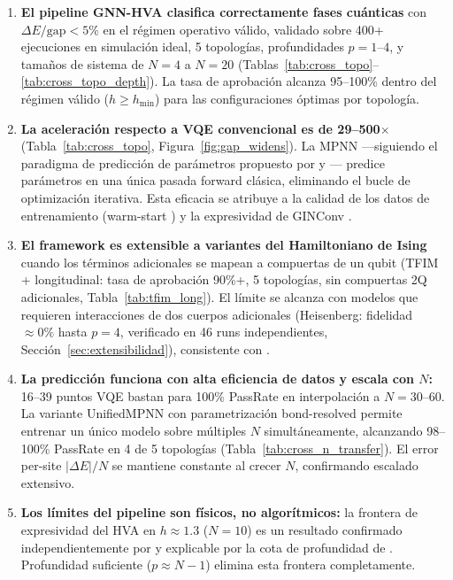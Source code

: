 \documentclass[11pt,a4paper,spanish]{book}
\begin{document}
\begin{enumerate}
    \item \textbf{El pipeline GNN-HVA clasifica correctamente fases cuánticas} con $\Delta E/\text{gap} < 5\%$ en el régimen operativo válido, validado sobre 400+ ejecuciones en simulación ideal, 5 topologías, profundidades $p = 1$--$4$, y tamaños de sistema de $N = 4$ a $N = 20$ (Tablas~\ref{tab:cross_topo}--\ref{tab:cross_topo_depth}). La tasa de aprobación alcanza 95--100\% dentro del régimen válido ($h \geq h_{\min}$) para las configuraciones óptimas por topología.

    \item \textbf{La aceleración respecto a VQE convencional es de 29--500$\times$} (Tabla~\ref{tab:cross_topo}, Figura~\ref{fig:gap_widens}). La MPNN ---siguiendo el paradigma de predicción de parámetros propuesto por \citet{miao2024} y \citet{zhang2025}--- predice parámetros en una única pasada forward clásica, eliminando el bucle de optimización iterativa. Esta eficacia se atribuye a la calidad de los datos de entrenamiento (warm-start \citep{puig2025}) y la expresividad de GINConv \citep{xu2019}.

    \item \textbf{El framework es extensible a variantes del Hamiltoniano de Ising} cuando los términos adicionales se mapean a compuertas de un qubit (TFIM + longitudinal: tasa de aprobación 90\%+, 5 topologías, sin compuertas 2Q adicionales, Tabla~\ref{tab:tfim_long}). El límite se alcanza con modelos que requieren interacciones de dos cuerpos adicionales (Heisenberg: fidelidad $\approx 0\%$ hasta $p = 4$, verificado en 46 runs independientes, Sección~\ref{sec:extensibilidad}), consistente con \citet{wiersema2020}.

    \item \textbf{La predicción funciona con alta eficiencia de datos y escala con $N$:} 16--39 puntos VQE bastan para 100\% PassRate en interpolación a $N = 30$--$60$. La variante UnifiedMPNN con parametrización bond-resolved permite entrenar un único modelo sobre múltiples $N$ simultáneamente, alcanzando 98--100\% PassRate en 4 de 5 topologías (Tabla~\ref{tab:cross_n_transfer}). El error per-site $|\Delta E|/N$ se mantiene constante al crecer $N$, confirmando escalado extensivo.

    \item \textbf{Los límites del pipeline son físicos, no algorítmicos:} la frontera de expresividad del HVA en $h \approx 1.3$ ($N = 10$) es un resultado confirmado independientemente por \citet{tripathi2026} y explicable por la cota de profundidad de \citet{sumeet2025}. Profundidad suficiente ($p \approx N-1$) elimina esta frontera completamente.
\end{enumerate}
\end{document}
